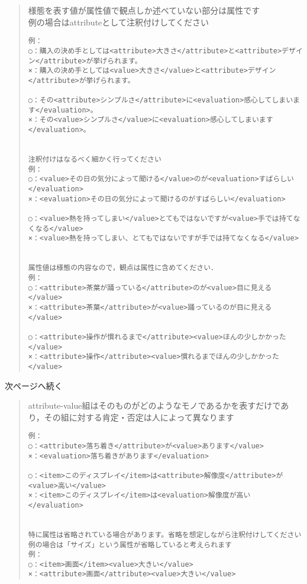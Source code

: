 \documentclass[japanese]{jnlp_1.4}
\begin{document}
\begin{screen}
\setlength{\baselineskip}{16pt}
\begin{quote}
様態を表す値が属性値で観点しか述べていない部分は属性です\\
例の場合はattributeとして注釈付けしてください
\begin{verbatim}
例：
○：購入の決め手としては<attribute>大きさ</attribute>と<attribute>デザイン</attribute>が挙げられます。
×：購入の決め手としては<value>大きさ</value>と<attribute>デザイン</attribute>が挙げられます。

○：その<attribute>シンプルさ</attribute>に<evaluation>感心してしまいます</evaluation>。
×：その<value>シンプルさ</value>に<evaluation>感心してしまいます</evaluation>。


注釈付けはなるべく細かく行ってください
例：
○：<value>その日の気分によって聞ける</value>のが<evaluation>すばらしい</evaluation>
×：<evaluation>その日の気分によって聞けるのがすばらしい</evaluation>

○：<value>熱を持ってしまい</value>とてもではないですが<value>手では持てなくなる</value>
×：<value>熱を持ってしまい、とてもではないですが手では持てなくなる</value>


属性値は様態の内容なので，観点は属性に含めてください．
例：
○：<attribute>茶葉が踊っている</attribute>のが<value>目に見える</value>
×：<attribute>茶葉</attribute>が<value>踊っているのが目に見える</value>

○：<attribute>操作が慣れるまで</attribute><value>ほんの少しかかった</value>
×：<attribute>操作</attribute><value>慣れるまでほんの少しかかった</value>
\end{verbatim}
\end{quote}
\end{screen}
次ページへ続く
\clearpage

\begin{screen}
\begin{quote}
attribute-value組はそのものがどのようなモノであるかを表すだけであり，その組に対する肯定・否定は人によって異なります
\begin{verbatim}
例：
○：<attribute>落ち着き</attribute>が<value>あります</value>
×：<evaluation>落ち着きがあります</evaluation>

○：<item>このディスプレイ</item>は<attribute>解像度</attribute>が<value>高い</value>
×：<item>このディスプレイ</item>は<evaluation>解像度が高い</evaluation>


特に属性は省略されている場合があります。省略を想定しながら注釈付けしてください
例の場合は「サイズ」という属性が省略していると考えられます
例：
○：<item>画面</item><value>大きい</value>
×：<attribute>画面</attribute><value>大きい</value>
\end{verbatim}
\end{quote}
\end{screen}
\end{document}
